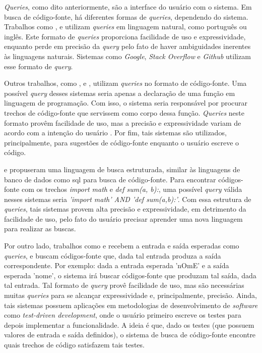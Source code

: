 \textit{Queries}, como dito anteriormente, são a interface do usuário com o sistema. Em busca de código-fonte, há diferentes formas de \textit{queries}, dependendo do sistema. 
Trabalhos como \cite{NGUYEN2017CombiningWW}, \cite{Chen2018ANF} e \cite{Du2021IsAS} utilizam \textit{queries} em linguagem natural, como português ou inglês. Este formato de \textit{queries} proporciona facilidade de uso e expressividade, enquanto perde em precisão da \textit{query} pelo fato de haver ambiguidades inerentes às linguagens naturais. Sistemas como \textit{Google}, \textit{Stack Overflow} e \textit{Github} utilizam esse formato de \textit{query}.

Outros trabalhos, como \textcite{Zhou2018SLAMPARC}, \textcite{Fujiwara2019CodetoCodeSB} e \textcite{Mukherjee2020SearchingAD}, utilizam \textit{queries} no formato de código-fonte. Uma possível \textit{query} desses sistemas seria apenas a declaração de uma função em linguagem de programação. Com isso, o sistema seria responsável por procurar trechos de código-fonte que servissem como corpo dessa função. \textit{Queries} neste formato provêm facilidade de uso, mas a precisão e expressividade variam de acordo com a intenção do usuário \cite{Grazia2022CodeSA}. Por fim, tais sistemas são utilizados, principalmente, para sugestões de código-fonte enquanto o usuário escreve o código.

\textcite{Martie2015CodeExchangeSR} e \textcite{Sivaraman2019ActiveIL} propuseram uma linguagem de busca estruturada, similar às linguagens de banco de dados como \gls{sql} para busca de código-fonte. Para encontrar códigos-fonte com os trechos \textit{import math} e \textit{def sum(a, b):}, uma possível \textit{query} válida nesses sistemas seria \textit{'import math' AND 'def sum(a,b):'}. Com essa estrutura de \textit{queries}, tais sistemas provem alta precisão e expressividade, em detrimento da facilidade de uso, pelo fato do usuário precisar aprender uma nova linguagem para realizar as buscas.

Por outro lado, trabalhos como \textcite{Reiss2009SemanticsbasedCS} e \textcite{Jiang2018ResearchPS} recebem a entrada e saída esperadas como \textit{queries}, e buscam códigos-fonte que, dada tal entrada produza a saída correspondente. Por exemplo: dada a entrada esperada 'nOmE' e a saída esperada 'nome', o sistema irá buscar códigos-fonte que produzam tal saída, dada tal entrada. Tal formato de \textit{query} provê facilidade de uso, mas são necessárias muitas \textit{queries} para se alcançar expressividade e, principalmente, precisão. Ainda, tais sistemas possuem aplicações em metodologias de desenvolvimento de \textit{software} como \textit{test-driven development}, onde o usuário primeiro escreve os testes para depois implementar a funcionalidade. A ideia é que, dado os testes (que possuem valores de entrada e saída definidos), o sistema de busca de código-fonte encontre quais trechos de código satisfazem tais testes.

